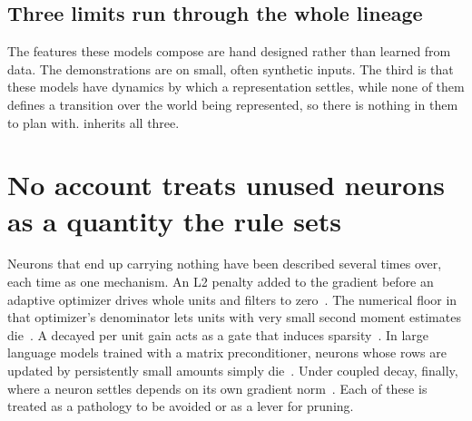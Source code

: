 \subsection{Three limits run through the whole lineage}
\label{sec:bg_substratelimits}

The features these models compose are hand designed rather than learned from data. The demonstrations are on
small, often synthetic inputs. The third is that these models have dynamics by
which a representation settles, while none of them defines a transition over
the world being represented, so there is nothing in them to plan with.
 inherits all three.


\section{No account treats unused neurons as a quantity the rule sets}
\label{sec:bg_gap}
%

Neurons that end up carrying nothing have been described several times over,
each time as one mechanism. An L2 penalty added to the gradient before an
adaptive optimizer drives whole units and filters to
zero~\cite{yaguchi_adam_2018, mehta_implicit_2019}. The numerical floor in that
optimizer's denominator lets units with very small second moment estimates
die~\cite{dufortlabbe_maxwell_2025}. A decayed per unit gain acts as a gate
that induces sparsity~\cite{mehta_implicit_2019, kolb_differentiable_2025}.
In large language models trained with a matrix
preconditioner, neurons whose rows are updated by persistently small amounts
simply die~\cite{dewulf_aurora_2026}. Under coupled decay, finally, where a
neuron settles depends on its own gradient norm~\cite{kosson_rotational_2024}. Each
of these is treated as a pathology to be avoided or as a lever for pruning.

